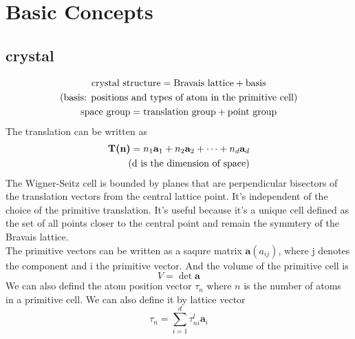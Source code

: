 \documentclass[11pt]{article}
\begin{document}
\section{Basic Concepts}
\subsection{crystal}
\begin{gather}
    \text{crystal structure}=\text{Bravais lattice}+\text{basis}\\
    \text{(basis: positions and types of atom in the primitive cell)}\notag\\
    \text{space group}=\text{translation group}+\text{point group}
\end{gather}
The translation can be written as
\begin{align}
    \textbf{T(n)}=n_1\textbf{a}_1+n_2\textbf{a}_2+\cdots+n_d\textbf{a}_d\\
    \text{(d is the dimension of space)}\notag 
\end{align}
The Wigner-Seitz cell is bounded by planes that are perpendicular bisectors of the translation vectors from the central lattice point.
It's independent of the choice of the primitive translation.
It's useful because it's a unique cell defined as the set of all points closer to the central point and remain the symmtery of the Bravais
lattice.\\
The primitive vectors can be written as a saqure matrix $\mathbf{a}(a_{ij})$, where j denotes the component and i the primitive vector. And the volume
of the primitive cell is
\begin{equation}
    V=\det{\mathbf{a}}
\end{equation}
We can also defind the atom position vector $\tau_n$ where $n$ is the number of atoms in a primitive cell. We can also define it by lattice vector
\begin{equation}
    \tau_n=\sum_{i=1}^{d}\tau^l_{ni}\mathbf{a}_i
\end{equation}
\end{document}
